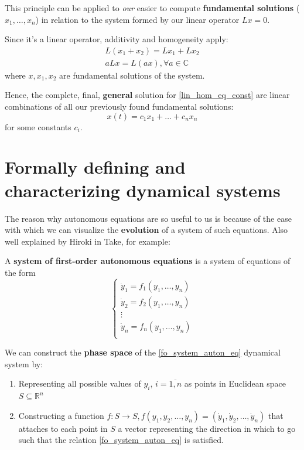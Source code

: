 This principle can be applied to \textit{our} easier to compute \textbf{fundamental solutions} ($x_1,\dots,x_n$) in relation to the system formed by our linear operator $Lx =0$.

Since it's a linear operator, additivity and homogeneity apply:
\begin{gather*}
	L(x_1+x_2) = Lx_1 + Lx_2\\
	aLx = L(ax) , \forall a \in \mathbb{C}
\end{gather*}
where $x,x_1,x_2$ are fundamental solutions of the system.

Hence, the complete, final, \textbf{general} solution for \ref{lin_hom_eq_const} are linear combinations of all our previously found fundamental solutions:
\[
	x(t) = c_1 x_1 + \dots + c_nx_n
\]
for some constants $c_i$.
\newpage
\section{Formally defining and characterizing dynamical systems}\label{ch:dynamical_systems}
The reason why autonomous equations are so useful to us is because of the ease with which we can visualize the \textbf{evolution} of a system of such equations. Also well explained by Hiroki in \cite{Hiroki2015}
Take, for example:
\begin{definition}
	A \textbf{system of first-order autonomous equations} is a system of equations of the form
	\begin{equation}\label{fo_system_auton_eq}
		\begin{cases}
			\dot{y}_1 = f_1(y_1,\dots, y_n) \\
			\dot{y}_2 = f_2(y_1,\dots, y_n) \\
			\vdots                          \\
			\dot{y}_n = f_n(y_1,\dots, y_n) \\
		\end{cases}
	\end{equation}
\end{definition}

\begin{definition}
	We can construct the \textbf{phase space} of the \ref{fo_system_auton_eq} dynamical system by:

	\begin{enumerate}
		\item Representing all possible values of $y_i$, $ i = \overline{1,n}$ as points in Euclidean space $S \subseteq \mathbb{R}^n$

		\item Constructing a function $f : S \rightarrow S, f(y_1,y_2,\dots,y_n) = (\dot{y}_1,\dot{y}_2,\dots,\dot{y}_n)$ that attaches to each point in $S$ a vector representing the direction in which to go such that the relation \ref{fo_system_auton_eq} is satisfied.
	\end{enumerate}
\end{definition}

